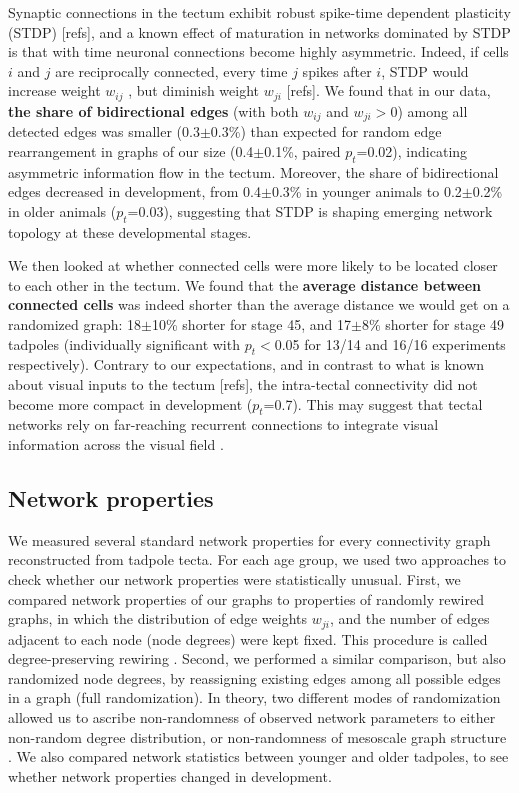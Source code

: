 \documentclass{article}
\begin{document}
Synaptic connections in the tectum exhibit robust spike-time dependent plasticity (STDP) \citep{mu2006stdp,pratt2008recurrent}[refs], and a known effect of maturation in networks dominated by STDP is that with time neuronal connections become highly asymmetric. Indeed, if cells $i$ and $j$ are reciprocally connected, every time $j$ spikes after $i$, STDP would increase weight $w_{ij}$ , but diminish weight $w_{ji}$ \citep{abbott1996ltpsequence}[refs]. We found that in our data, \textbf{the share of bidirectional edges} (with both $w_{ij}$ and $w_{ji}>$0) among all detected edges was smaller (0.3$\pm$0.3\%) than expected for random edge rearrangement in graphs of our size (0.4$\pm$0.1\%, paired $p_t$=0.02), indicating asymmetric information flow in the tectum. Moreover, the share of bidirectional edges decreased in development, from 0.4$\pm$0.3\% in younger animals to 0.2$\pm$0.2\% in older animals ($p_t$=0.03), suggesting that STDP is shaping emerging network topology at these developmental stages.

We then looked at whether connected cells were more likely to be located closer to each other in the tectum. We found that the \textbf{average distance between connected cells} was indeed shorter than the average distance we would get on a randomized graph: 18$\pm$10\% shorter for stage 45, and 17$\pm$8\% shorter for stage 49 tadpoles (individually significant with $p_t<$0.05 for 13/14 and 16/16 experiments respectively). Contrary to our expectations, and in contrast to what is known about visual inputs to the tectum \citep{tao2005refinement}[refs], the intra-tectal connectivity did not become more compact in development ($p_t$=0.7). This may suggest that tectal networks rely on far-reaching recurrent connections to integrate visual information across the visual field \citep{baginskas2009recurrent,liu2016jumbo,jang2016}.

\subsection*{Network properties}

We measured several standard network properties for every connectivity graph reconstructed from tadpole tecta. For each age group, we used two approaches to check whether our network properties were statistically unusual. First, we compared network properties of our graphs to properties of randomly rewired graphs, in which the distribution of edge weights $w_{ji}$, and the number of edges adjacent to each node (node degrees) were kept fixed. This procedure is called degree-preserving rewiring \citep{maslov2002}. Second, we performed a similar comparison, but also randomized node degrees, by reassigning existing edges among all possible edges in a graph (full randomization). In theory, two different modes of randomization allowed us to ascribe non-randomness of observed network parameters to either non-random degree distribution, or non-randomness of mesoscale graph structure \citep{ansmann2012surrogate}. We also compared network statistics between younger and older tadpoles, to see whether network properties changed in development.
\end{document}
